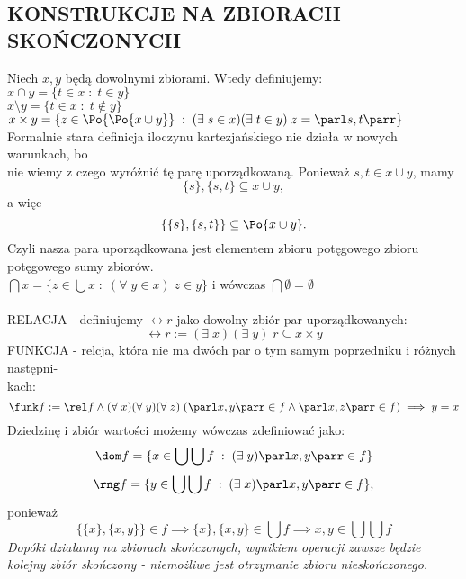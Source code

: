 \documentclass{article}
\begin{document}
\subsection{KONSTRUKCJE NA ZBIORACH SKOŃCZONYCH}
Niech $x, y$ będą dowolnymi zbiorami. Wtedy definiujemy:\medskip\\
    \indent $x\cap y=\{t\in x\;:\;t\in y\}$\smallskip\\
    \indent $x\setminus y=\{t\in x\;:\; t\notin y\}$\smallskip\\
    \indent $x\times y=\{z\in \Po{\Po{x\cup y}}\;:\;(\exists\; s\in x)(\exists\;t\in y)\;z=\parl s, t\parr\}$\medskip\\
Formalnie stara definicja iloczynu kartezjańskiego nie działa w nowych warunkach, bo \\nie wiemy z czego wyróżnić tę parę uporządkowaną. Ponieważ $s, t\in x\cup y$, mamy
$$\{s\}, \{s, t\}\subseteq x\cup y,$$
a więc 
$$\{\{s\}, \{s, t\}\}\subseteq \Po{x\cup y}.$$
Czyli nasza para uporządkowana jest elementem zbioru potęgowego zbioru potęgowego sumy zbiorów.\medskip\\
    \indent $\bigcap x=\{z\in \bigcup x\;:\;(\forall\;y\in x)\;z\in y\}$ i wówczas $\bigcap\emptyset=\emptyset$\bigskip\\
\bigskip\\
{\color{def}RELACJA} - definiujemy $\rel r$ jako dowolny zbiór par uporządkowanych:
$$\rel r :=(\exists\;x)(\exists\;y)\;r\subseteq x\times y$$
{\color{def}FUNKCJA} - relcja, która nie ma dwóch par o tym samym poprzedniku i różnych następni-\\kach:
$$\funk f := \rel f \land (\forall\;x)(\forall\;y)(\forall\;z)\;(\parl x,y\parr\in f\land \parl x, z\parr \in f)\implies y = x$$
Dziedzinę i zbiór wartości możemy wówczas zdefiniować jako:
$$\dom f = \{x\in \bigcup \bigcup f\;:\;(\exists\;y)\parl x,y\parr \in f\}$$
$$\rng f = \{y\in \bigcup \bigcup f\;:\;(\exists\;x)\parl x,y\parr \in f\},$$
ponieważ 
$$\{\{x\}, \{x, y\}\}\in f\implies \{x\}, \{x, y\}\in \bigcup f\implies x,y\in\bigcup\bigcup f$$
\emph{Dopóki działamy na zbiorach skończonych, wynikiem operacji zawsze będzie kolejny zbiór skończony - niemożliwe jest otrzymanie zbioru nieskończonego.}
\end{document}
